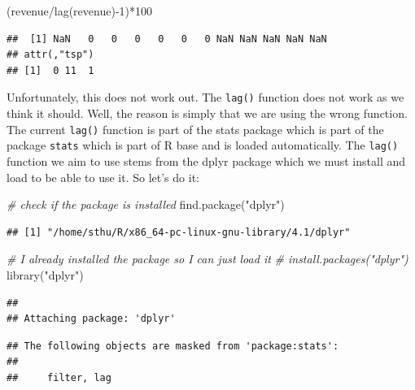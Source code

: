 \documentclass[
  12pt,
  oneside]{book}
\newenvironment{Shaded}{\begin{snugshade}}{\end{snugshade}}
\newcommand{\CommentTok}[1]{\textcolor[rgb]{0.56,0.35,0.01}{\textit{#1}}}
\newcommand{\DecValTok}[1]{\textcolor[rgb]{0.00,0.00,0.81}{#1}}
\newcommand{\FunctionTok}[1]{\textcolor[rgb]{0.00,0.00,0.00}{#1}}
\newcommand{\NormalTok}[1]{#1}
\newcommand{\SpecialCharTok}[1]{\textcolor[rgb]{0.00,0.00,0.00}{#1}}
\newcommand{\StringTok}[1]{\textcolor[rgb]{0.31,0.60,0.02}{#1}}
\theoremstyle{definition}
\theoremstyle{definition}
\theoremstyle{definition}
\theoremstyle{definition}
\theoremstyle{remark}
\begin{document}
\begin{Shaded}
\begin{Highlighting}[]
\NormalTok{(revenue}\SpecialCharTok{/}\FunctionTok{lag}\NormalTok{(revenue)}\SpecialCharTok{{-}}\DecValTok{1}\NormalTok{)}\SpecialCharTok{*}\DecValTok{100} 
\end{Highlighting}
\end{Shaded}

\begin{verbatim}
##  [1] NaN   0   0   0   0   0   0 NaN NaN NaN NaN NaN
## attr(,"tsp")
## [1]  0 11  1
\end{verbatim}

Unfortunately, this does not work out. The \texttt{lag()} function does not work as we think it should. Well, the reason is simply that we are using the wrong function. The current \texttt{lag()} function is part of the stats package which is part of the package \texttt{stats} which is part of R base and is loaded automatically. The \texttt{lag()} function we aim to use stems from the dplyr package which we must install and load to be able to use it. So let's do it:

\begin{Shaded}
\begin{Highlighting}[]
\CommentTok{\# check if the package is installed}
\FunctionTok{find.package}\NormalTok{(}\StringTok{"dplyr"}\NormalTok{)}
\end{Highlighting}
\end{Shaded}

\begin{verbatim}
## [1] "/home/sthu/R/x86_64-pc-linux-gnu-library/4.1/dplyr"
\end{verbatim}

\begin{Shaded}
\begin{Highlighting}[]
\CommentTok{\# I already installed the package so I can just load it}
\CommentTok{\# install.packages("dplyr")}
\FunctionTok{library}\NormalTok{(}\StringTok{"dplyr"}\NormalTok{)}
\end{Highlighting}
\end{Shaded}

\begin{verbatim}
## 
## Attaching package: 'dplyr'
\end{verbatim}

\begin{verbatim}
## The following objects are masked from 'package:stats':
## 
##     filter, lag
\end{verbatim}
\end{document}
